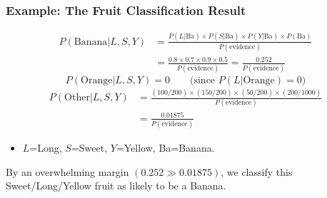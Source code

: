 \begin{frame}[fragile]\frametitle{Example: The Fruit Classification Result}
\small
\begin{align*}
P(\text{Banana}|L,S,Y) &= \frac{P(L|\text{Ba})\times P(S|\text{Ba})\times P(Y|\text{Ba})\times P(\text{Ba})}{P(\text{evidence})}\\
&= \frac{0.8\times0.7\times0.9\times0.5}{P(\text{evidence})} = \frac{0.252}{P(\text{evidence})}
\end{align*}
\[
P(\text{Orange}|L,S,Y) = 0 \qquad \text{(since } P(L|\text{Orange})=0\text{)}
\]
\begin{align*}
P(\text{Other}|L,S,Y) &= \frac{(100/200)\times(150/200)\times(50/200)\times(200/1000)}{P(\text{evidence})}\\
&= \frac{0.01875}{P(\text{evidence})}
\end{align*}
\normalsize
\begin{itemize}
\item $L$=Long, $S$=Sweet, $Y$=Yellow, Ba=Banana.
\end{itemize}
By an overwhelming margin $(0.252 \gg 0.01875)$, we classify this Sweet/Long/Yellow fruit as likely to be a Banana.
 \end{frame}


%
%

